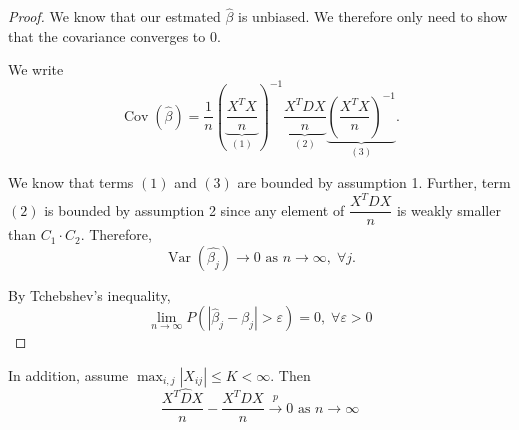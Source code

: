 \documentclass[11pt, %
	oneside, %
	english, %
	onehalfspacing, %
	]{article} %
\numberwithin{equation}{section}
\begin{document}
\begin{proof}
    We know that our estmated $\hat{\beta}$ is unbiased. We therefore only need to show that the covariance converges to 0.

    We write
    $$
    \operatorname{Cov} \left( \hat{\beta}\right) = \frac{1}{n} \left( \underbrace{ \frac{X^TX}{n}}_{ (1) } \right)^{-1} \underbrace{ \frac{X^TD X}{n}  }_{ (2) }\underbrace{ \left( \frac{X^TX}{n} \right)^{-1} }_{ (3) }.
    $$

    We know that terms $(1)$ and $(3)$ are bounded by assumption 1. Further, term $(2)$ is bounded by assumption 2 since any element of $\dfrac{X^T D X}{n}$ is weakly smaller than $C_1 \cdot C_2$.  Therefore,
    $$
    \operatorname{Var} \left( \hat{\beta_j}\right) \to 0 \text{ as } n \to \infty, \;\forall j.
    $$

    By Tchebshev's inequality,
    $$
    \lim_{ n \to \infty } P \left( \left| \hat{\beta}_j - \beta_j \right| > \varepsilon  \right) = 0, \;\forall \varepsilon > 0
    $$
\end{proof}

\begin{lemma}{}{}
    In addition, assume $\max_{i,j} |X_{ij}| \leq K <\infty$. Then
    \begin{equation*}
        \frac{X^T \hat{D} X}{n} - \frac{X^T D X}{n} \overset{p}{\to} 0 \text{ as } n \to \infty
    \end{equation*}
\end{lemma}
\end{document}
